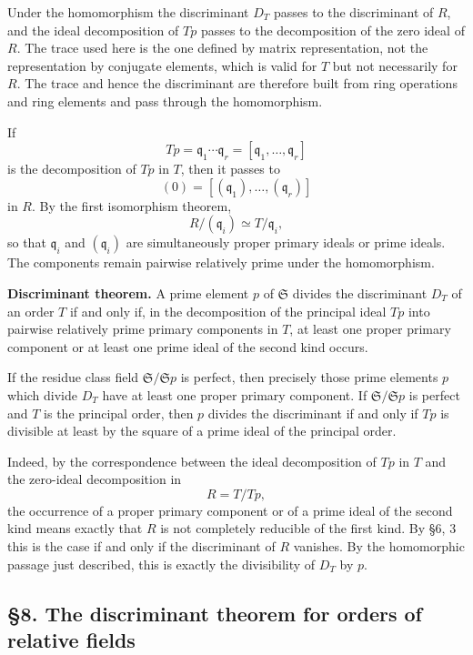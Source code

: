 \documentclass[
  12pt,
]{article}
\begin{document}
Under the homomorphism the discriminant \(D_T\) passes to the
discriminant of \(R\), and the ideal decomposition of \(Tp\) passes to
the decomposition of the zero ideal of \(R\). The trace used here is the
one defined by matrix representation, not the representation by
conjugate elements, which is valid for \(T\) but not necessarily for
\(R\). The trace and hence the discriminant are therefore built from
ring operations and ring elements and pass through the homomorphism.

If \[
  Tp=\mathfrak q_1\cdots\mathfrak q_r
       =[\mathfrak q_1,
\ldots,
\mathfrak q_r]
\] is the decomposition of \(Tp\) in \(T\), then it passes to \[
  (0)=[(\mathfrak q_1),
\ldots,(
\mathfrak q_r)]
\] in \(R\). By the first isomorphism theorem, \[
  R/(\mathfrak q_i)\simeq T/\mathfrak q_i,
\] so that \(\mathfrak q_i\) and \((\mathfrak q_i)\) are simultaneously
proper primary ideals or prime ideals. The components remain pairwise
relatively prime under the homomorphism.

\textbf{Discriminant theorem.} A prime element \(p\) of \(\mathfrak S\)
divides the discriminant \(D_T\) of an order \(T\) if and only if, in
the decomposition of the principal ideal \(Tp\) into pairwise relatively
prime primary components in \(T\), at least one proper primary component
or at least one prime ideal of the second kind occurs.

If the residue class field \(\mathfrak S/\mathfrak S p\) is perfect,
then precisely those prime elements \(p\) which divide \(D_T\) have at
least one proper primary component. If \(\mathfrak S/\mathfrak S p\) is
perfect and \(T\) is the principal order, then \(p\) divides the
discriminant if and only if \(Tp\) is divisible at least by the square
of a prime ideal of the principal order.

Indeed, by the correspondence between the ideal decomposition of \(Tp\)
in \(T\) and the zero-ideal decomposition in \[
  R=T/Tp,
\] the occurrence of a proper primary component or of a prime ideal of
the second kind means exactly that \(R\) is not completely reducible of
the first kind. By §6, 3 this is the case if and only if the
discriminant of \(R\) vanishes. By the homomorphic passage just
described, this is exactly the divisibility of \(D_T\) by \(p\).

\subsection{§8. The discriminant theorem for orders of relative
fields}\label{the-discriminant-theorem-for-orders-of-relative-fields}
\end{document}
